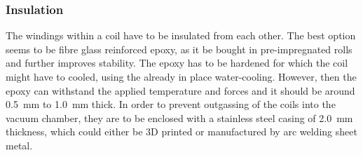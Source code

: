\subsubsection{Insulation}
The windings within a coil have to be insulated from each other.
The best option seems to be fibre glass reinforced epoxy, as it be bought in pre-impregnated rolls and further improves stability.
The epoxy has to be hardened for which the coil might have to cooled, using the already in place water-cooling.
However, then the epoxy can withstand the applied temperature and forces and it should be around \SI{0.5}{mm} to \SI{1.0}{mm} thick.
In order to prevent outgassing of the coils into the vacuum chamber, they are to be enclosed with a stainless steel casing of \SI{2.0}{mm} thickness, which could either be 3D printed or manufactured by arc welding sheet metal.\\

